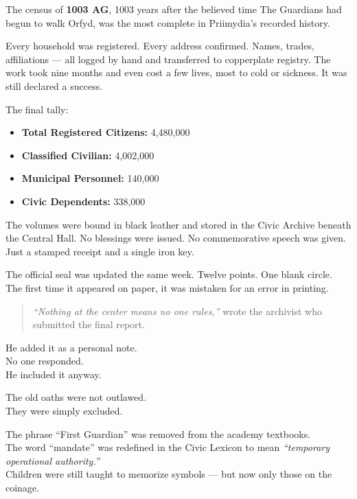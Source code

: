 \documentclass[12pt]{article}
\begin{document}
The census of \textbf{1003 AG}, 1003 years after the believed time The Guardians had begun to walk Orfyd, was the most complete in Priimydia’s recorded history.

Every household was registered. Every address confirmed. Names, trades, affiliations --- all logged by hand and transferred to copperplate registry. The work took nine months and even cost a few lives, most to cold or sickness. It was still declared a success.

The final tally:
\begin{itemize}
    \item \textbf{Total Registered Citizens:} 4,480,000
    \item \textbf{Classified Civilian:} 4,002,000
    \item \textbf{Municipal Personnel:} 140,000
    \item \textbf{Civic Dependents:} 338,000
\end{itemize}

The volumes were bound in black leather and stored in the Civic Archive beneath the Central Hall. No blessings were issued. No commemorative speech was given. Just a stamped receipt and a single iron key.

\vspace{1em}

The official seal was updated the same week. Twelve points. One blank circle. The first time it appeared on paper, it was mistaken for an error in printing.

\begin{quote}
\textit{“Nothing at the center means no one rules,”} wrote the archivist who submitted the final report.
\end{quote}

He added it as a personal note.\\
No one responded.\\
He included it anyway.

\vspace{1em}

The old oaths were not outlawed.\\
They were simply excluded.

The phrase ``First Guardian'' was removed from the academy textbooks.\\
The word ``mandate'' was redefined in the Civic Lexicon to mean \textit{“temporary operational authority.”}\\
Children were still taught to memorize symbols --- but now only those on the coinage.
\end{document}
